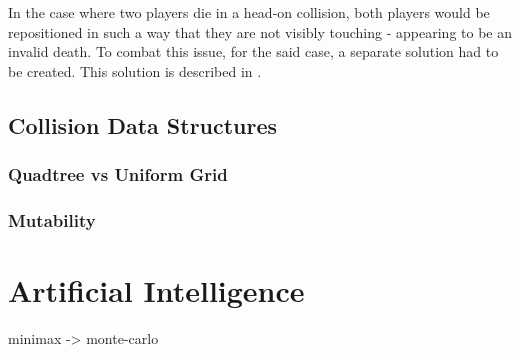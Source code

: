 \documentclass{standalone}
\begin{document}
			In the case where two players die in a head-on collision, both players would be repositioned in such a way that they are not visibly touching - appearing to be an invalid death. To combat this issue, for the said case, a separate solution had to be created. This solution is described in .

		\subsection{Collision Data Structures}
			\subsubsection{Quadtree vs Uniform Grid}

			\subsubsection{Mutability}

	\section{Artificial Intelligence}
		minimax -> monte-carlo
\end{document}
